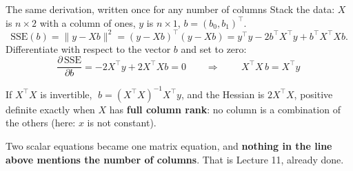 \documentclass[aspectratio=169]{beamer}
\begin{document}
\begin{frame}[shrink=5]{The same derivation, written once for any number of columns}
  Stack the data: $X$ is $n \times 2$ with a column of ones, $y$ is
  $n \times 1$, $b = (b_0, b_1)^{\!\top}$.
  \[
    \mathrm{SSE}(b) = \lVert y - Xb\rVert^2
      = (y - Xb)^{\!\top}(y - Xb)
      = y^{\!\top}y - 2b^{\!\top}X^{\!\top}y + b^{\!\top}X^{\!\top}Xb .
  \]
  Differentiate with respect to the vector $b$ and set to zero:
  \[
    \frac{\partial\,\mathrm{SSE}}{\partial b}
      = -2X^{\!\top}y + 2X^{\!\top}Xb = 0
    \qquad\Longrightarrow\qquad
    \boxed{\,X^{\!\top}\!X\,b = X^{\!\top}y\,}
  \]
  \begin{exampleblock}{}
    \centering
    If $X^{\!\top}\!X$ is invertible,
    $\;b = (X^{\!\top}\!X)^{-1}X^{\!\top}y$, and the Hessian is
    $2X^{\!\top}\!X$, positive definite exactly when $X$ has \textbf{full
    column rank}: no column is a combination of the others (here: $x$ is not
    constant).
  \end{exampleblock}
  \begin{center}\small
    Two scalar equations became one matrix equation, and \textbf{nothing in
    the line above mentions the number of columns}. That is Lecture 11,
    already done.
  \end{center}
\end{frame}
\end{document}
